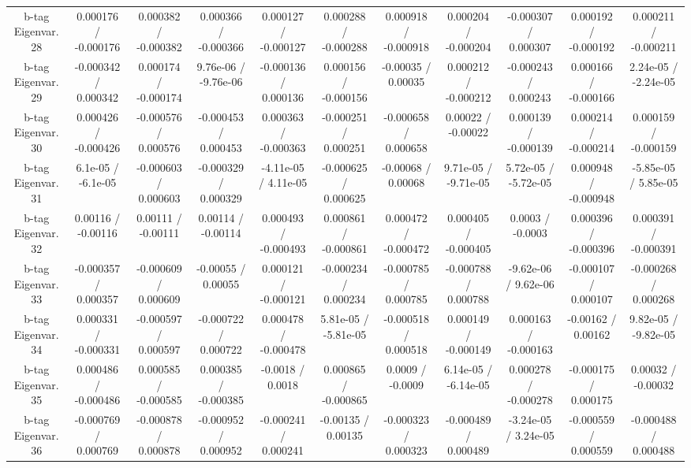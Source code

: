 \begin{table}[htbp]
\begin{center}
\begin{tabular}{|c|c|c|c|c|c|c|c|c|c|c|}
  b-tag Eigenvar. 28 & 0.000176 / -0.000176 & 0.000382 / -0.000382 & 0.000366 / -0.000366 & 0.000127 / -0.000127 & 0.000288 / -0.000288 & 0.000918 / -0.000918 & 0.000204 / -0.000204 & -0.000307 / 0.000307 & 0.000192 / -0.000192 & 0.000211 / -0.000211 \\ 
  b-tag Eigenvar. 29 & -0.000342 / 0.000342 & 0.000174 / -0.000174 & 9.76e-06 / -9.76e-06 & -0.000136 / 0.000136 & 0.000156 / -0.000156 & -0.00035 / 0.00035 & 0.000212 / -0.000212 & -0.000243 / 0.000243 & 0.000166 / -0.000166 & 2.24e-05 / -2.24e-05 \\ 
  b-tag Eigenvar. 30 & 0.000426 / -0.000426 & -0.000576 / 0.000576 & -0.000453 / 0.000453 & 0.000363 / -0.000363 & -0.000251 / 0.000251 & -0.000658 / 0.000658 & 0.00022 / -0.00022 & 0.000139 / -0.000139 & 0.000214 / -0.000214 & 0.000159 / -0.000159 \\ 
  b-tag Eigenvar. 31 & 6.1e-05 / -6.1e-05 & -0.000603 / 0.000603 & -0.000329 / 0.000329 & -4.11e-05 / 4.11e-05 & -0.000625 / 0.000625 & -0.00068 / 0.00068 & 9.71e-05 / -9.71e-05 & 5.72e-05 / -5.72e-05 & 0.000948 / -0.000948 & -5.85e-05 / 5.85e-05 \\ 
  b-tag Eigenvar. 32 & 0.00116 / -0.00116 & 0.00111 / -0.00111 & 0.00114 / -0.00114 & 0.000493 / -0.000493 & 0.000861 / -0.000861 & 0.000472 / -0.000472 & 0.000405 / -0.000405 & 0.0003 / -0.0003 & 0.000396 / -0.000396 & 0.000391 / -0.000391 \\ 
  b-tag Eigenvar. 33 & -0.000357 / 0.000357 & -0.000609 / 0.000609 & -0.00055 / 0.00055 & 0.000121 / -0.000121 & -0.000234 / 0.000234 & -0.000785 / 0.000785 & -0.000788 / 0.000788 & -9.62e-06 / 9.62e-06 & -0.000107 / 0.000107 & -0.000268 / 0.000268 \\ 
  b-tag Eigenvar. 34 & 0.000331 / -0.000331 & -0.000597 / 0.000597 & -0.000722 / 0.000722 & 0.000478 / -0.000478 & 5.81e-05 / -5.81e-05 & -0.000518 / 0.000518 & 0.000149 / -0.000149 & 0.000163 / -0.000163 & -0.00162 / 0.00162 & 9.82e-05 / -9.82e-05 \\ 
  b-tag Eigenvar. 35 & 0.000486 / -0.000486 & 0.000585 / -0.000585 & 0.000385 / -0.000385 & -0.0018 / 0.0018 & 0.000865 / -0.000865 & 0.0009 / -0.0009 & 6.14e-05 / -6.14e-05 & 0.000278 / -0.000278 & -0.000175 / 0.000175 & 0.00032 / -0.00032 \\ 
  b-tag Eigenvar. 36 & -0.000769 / 0.000769 & -0.000878 / 0.000878 & -0.000952 / 0.000952 & -0.000241 / 0.000241 & -0.00135 / 0.00135 & -0.000323 / 0.000323 & -0.000489 / 0.000489 & -3.24e-05 / 3.24e-05 & -0.000559 / 0.000559 & -0.000488 / 0.000488 \\ 

\end{tabular}
\end{center}
\end{table}
